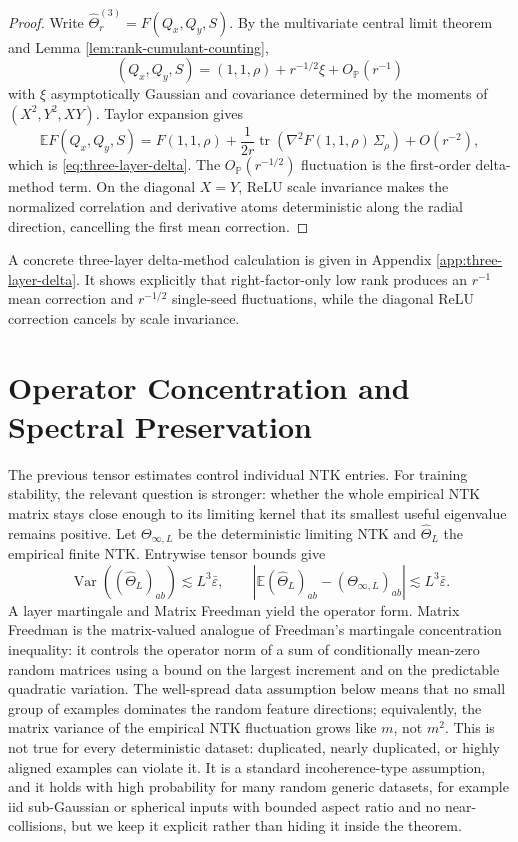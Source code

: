 \documentclass{article}
\newcommand{\E}{\mathbb E}
\newcommand{\Pp}{\mathbb P}
\newcommand{\Var}{\operatorname{Var}}
\newcommand{\tr}{\operatorname{tr}}
\newcommand{\wh}{\widehat}
\newcommand{\barE}{\bar\varepsilon}
\begin{document}
\begin{proof}
Write \(\wh\Theta^{(3)}_r=F(Q_x,Q_y,S)\). By the multivariate central limit theorem and Lemma \ref{lem:rank-cumulant-counting},
\[
(Q_x,Q_y,S)=(1,1,\rho)+r^{-1/2}\xi+O_{\Pp}(r^{-1})
\]
with \(\xi\) asymptotically Gaussian and covariance determined by the moments of \((X^2,Y^2,XY)\). Taylor expansion gives
\[
\E F(Q_x,Q_y,S)
=F(1,1,\rho)+\frac1{2r}\tr\left(\nabla^2F(1,1,\rho)\,\Sigma_\rho\right)+O(r^{-2}),
\]
which is \eqref{eq:three-layer-delta}. The \(O_{\Pp}(r^{-1/2})\) fluctuation is the first-order delta-method term. On the diagonal \(X=Y\), ReLU scale invariance makes the normalized correlation and derivative atoms deterministic along the radial direction, cancelling the first mean correction.
\end{proof}
\fi

A concrete three-layer delta-method calculation is given in Appendix \ref{app:three-layer-delta}. It shows explicitly that right-factor-only low rank produces an \(r^{-1}\) mean correction and \(r^{-1/2}\) single-seed fluctuations, while the diagonal ReLU correction cancels by scale invariance.

\section{Operator Concentration and Spectral Preservation}
The previous tensor estimates control individual NTK entries. For training stability, the relevant question is stronger: whether the whole empirical NTK matrix stays close enough to its limiting kernel that its smallest useful eigenvalue remains positive.
Let \(\Theta_{\infty,L}\) be the deterministic limiting NTK and \(\wh\Theta_L\) the empirical finite NTK. Entrywise tensor bounds give
\begin{equation}
\Var((\wh\Theta_L)_{ab})\lesssim L^3\barE,
\qquad
|\E(\wh\Theta_L)_{ab}-(\Theta_{\infty,L})_{ab}|\lesssim L^3\barE.
\end{equation}
A layer martingale and Matrix Freedman yield the operator form. Matrix Freedman is the matrix-valued analogue of Freedman's martingale concentration inequality: it controls the operator norm of a sum of conditionally mean-zero random matrices using a bound on the largest increment and on the predictable quadratic variation. The well-spread data assumption below means that no small group of examples dominates the random feature directions; equivalently, the matrix variance of the empirical NTK fluctuation grows like \(m\), not \(m^2\). This is not true for every deterministic dataset: duplicated, nearly duplicated, or highly aligned examples can violate it. It is a standard incoherence-type assumption, and it holds with high probability for many random generic datasets, for example iid sub-Gaussian or spherical inputs with bounded aspect ratio and no near-collisions, but we keep it explicit rather than hiding it inside the theorem.
\end{document}
